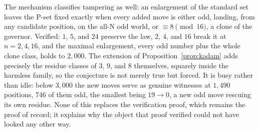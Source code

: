 \begin{remark}
The mechanism classifies tampering as well: an enlargement of
the standard set leaves the P-set fixed exactly when every added move is
either odd, landing, from any candidate position, on the all-N odd world,
or $\equiv 8 \pmod{16}$, a clone of the governor. Verified: $1$, $5$,
and $24$ preserve the law, $2$, $4$, and $16$ break it at $n = 2, 4, 16$,
and the maximal enlargement, every odd number plus the whole clone class,
holds to $2{,}000$. The extension of Proposition~\ref{prop:kadam} adds
precisely the residue classes of $3$, $9$, and $8$ themselves, squarely
inside the harmless family, so the conjecture is not merely true but
forced. It is busy rather than idle: below $3{,}000$ the new moves serve
as genuine witnesses at $1{,}490$ positions, $746$ of them odd, the
smallest being $19 \to 0$, a new odd move rescuing its own residue. None
of this replaces the verification proof, which remains the proof of
record; it explains why the object that proof verified could not have
looked any other way.
\end{remark}

